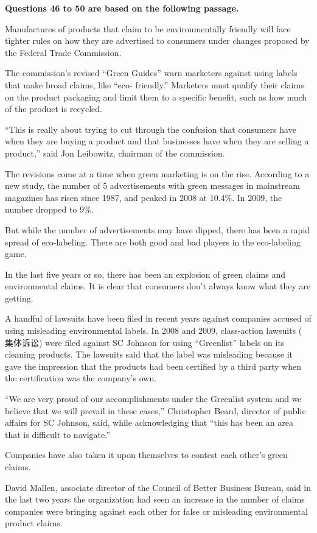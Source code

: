 \documentclass[UTF8,11pt]{ctexart}
\begin{document}
\textbf{Questions 46 to 50 are based on the following passage.}


Manufactures of products that claim to be environmentally friendly will face tighter rules on how they are advertised to consumers under changes proposed by the Federal Trade Commission.


The commission’s revised “Green Guides” warn marketers against using labels that make broad claims, like “eco- friendly.” Marketers must qualify their claims on the product packaging and limit them to a specific benefit, such as how much of the product is recycled.


“This is really about trying to cut through the confusion that consumers have when they are buying a product and that businesses have when they are selling a product,” said Jon Leibowitz, chairman of the commission.


The revisions come at a time when green marketing is on the rise. According to a new study, the number of 5 advertisements with green messages in mainstream magazines has risen since 1987, and peaked in 2008 at 10.4\%. In 2009, the number dropped to 9\%.


But while the number of advertisements may have dipped, there has been a rapid spread of eco-labeling. There are both good and bad players in the eco-labeling game.


In the last five years or so, there has been an explosion of green claims and environmental claims. It is clear that consumers don’t always know what they are getting.


A handful of lawsuits have been filed in recent years against companies accused of using misleading environmental labels. In 2008 and 2009, class-action lawsuits ( 集体诉讼) were filed against SC Johnson for using “Greenlist” labels on its cleaning products. The lawsuits said that the label was misleading because it gave the impression that the products had been certified by a third party when the certification was the company’s own.


“We are very proud of our accomplishments under the Greenlist system and we believe that we will prevail in these cases,” Christopher Beard, director of public affairs for SC Johnson, said, while acknowledging that “this has been an area that is difficult to navigate.”


Companies have also taken it upon themselves to contest each other’s green claims.


David Mallen, associate director of the Council of Better Business Bureau, said in the last two years the organization had seen an increase in the number of claims companies were bringing against each other for false or misleading environmental product claims.
\end{document}
